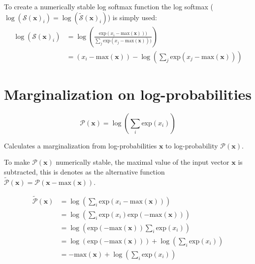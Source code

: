 To create a numerically stable log softmax function the log softmax ($\log(\mathcal{S}(\mathbf{x})_i) = \log(\tilde{\mathcal{S}}(\mathbf{x})_i)$) is simply used:
\begin{equation}
\begin{aligned}
\log(\mathcal{S}(\mathbf{x})_i) 
&= \log\left(\frac{\mathrm{exp}(x_i - \mathrm{max}(\mathbf{x})))}{\sum_j \mathrm{exp}(x_j - \mathrm{max}(\mathbf{x})))}\right) \\
&= (x_i - \mathrm{max}(\mathbf{x})) - \log\left(\sum_j \mathrm{exp}(x_j - \mathrm{max}(\mathbf{x}))\right)
\end{aligned}
\end{equation}

\clearpage
\section{Marginalization on log-probabilities}
\label{appendix:numerical-stability:log-sum-exp}

\begin{equationbox}[H]
\begin{equation*}
\mathcal{P}(\mathbf{x}) = \log\left(\sum_i \mathrm{exp}(x_i)\right)
\end{equation*}
\caption{Calculates a marginalization from log-probabilities $\mathbf{x}$ to log-probability $\mathcal{P}(\mathbf{x})$.}
\end{equationbox}

To make $\mathcal{P}(\mathbf{x})$ numerically stable, the maximal value of the input vector $\mathbf{x}$ is subtracted, this is denotes as the alternative function $\tilde{\mathcal{P}}(\mathbf{x}) = \mathcal{P}(\mathbf{x} - \mathrm{max}(\mathbf{x}))$.

\begin{equation}
\begin{aligned}
\tilde{\mathcal{P}}(\mathbf{x}) &= \log\left(\sum_i \mathrm{exp}(x_i - \mathrm{max}(\mathbf{x}))\right) \\
&= \log\left(\sum_i \mathrm{exp}(x_i)\mathrm{exp}(- \mathrm{max}(\mathbf{x}))\right) \\
&= \log\left(\mathrm{exp}(- \mathrm{max}(\mathbf{x})) \sum_i \mathrm{exp}(x_i)\right) \\
&= \log(\mathrm{exp}(- \mathrm{max}(\mathbf{x}))) + \log\left(\sum_i \mathrm{exp}(x_i)\right) \\
&= - \mathrm{max}(\mathbf{x}) + \log\left(\sum_i \mathrm{exp}(x_i)\right)
\end{aligned}
\label{eq:appendix:numerical:log-sum-exp:lsx-mmax}
\end{equation}

